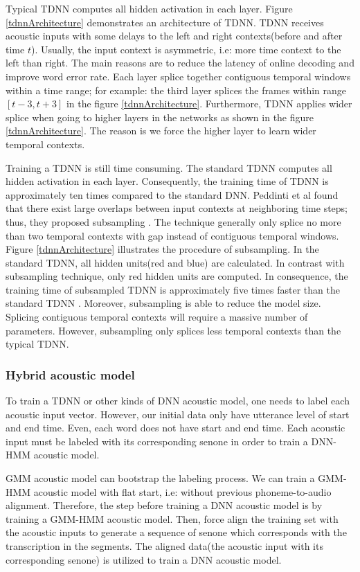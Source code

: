 Typical TDNN computes all hidden activation in each layer. Figure \ref{tdnnArchitecture} demonstrates an architecture of TDNN. TDNN receives acoustic inputs with some delays to the left and right contexts(before and after time $t$). Usually, the input context is asymmetric, i.e: more time context to the left than right. The main reasons are to reduce the latency of online decoding and improve word error rate. Each layer splice together contiguous temporal windows within a time range; for example: the third layer splices the frames within range $[t-3, t+3]$ in the figure  \ref{tdnnArchitecture}. Furthermore, TDNN applies wider splice when going to higher layers in the networks as shown in the figure \ref{tdnnArchitecture}. The reason is we force the higher layer to learn wider temporal contexts.

Training a TDNN is still time consuming. The standard TDNN computes all hidden activation in each layer. Consequently, the training time of TDNN is approximately ten times compared to the standard DNN.  Peddinti et al found that there exist large overlaps between input contexts at neighboring time steps; thus, they proposed subsampling \cite{Peddinti2015ATD}. The technique generally only splice no more than two temporal contexts with gap instead of contiguous temporal windows. Figure \ref{tdnnArchitecture} illustrates the procedure of subsampling. In the standard TDNN, all hidden units(red and blue) are calculated. In contrast with subsampling technique, only red hidden units are computed. In consequence, the training time of subsampled TDNN is approximately five times faster than the standard TDNN \cite{Peddinti2015ATD}. Moreover, subsampling is able to reduce the model size. Splicing contiguous temporal contexts will require a massive number of parameters. However, subsampling only splices less temporal contexts than the typical TDNN.

\subsubsection{Hybrid acoustic model}
\label{HybridAcousticModel}
To train a TDNN or other kinds of DNN acoustic model, one needs to label each acoustic input vector. However, our initial data only have utterance level of start and end time. Even, each word does not have start and end time. Each acoustic input must be labeled with its corresponding senone in order to train a DNN-HMM acoustic model. 

GMM acoustic model can bootstrap the labeling process\cite{1406.7806}. We can train a GMM-HMM acoustic model with flat start, i.e: without previous phoneme-to-audio alignment.  Therefore, the step before training a DNN acoustic model is by training a GMM-HMM acoustic model. Then, force align the training set with the acoustic inputs to generate a sequence of senone which corresponds with the transcription in the segments. The aligned data(the acoustic input with its corresponding senone) is utilized to train a DNN acoustic model.

